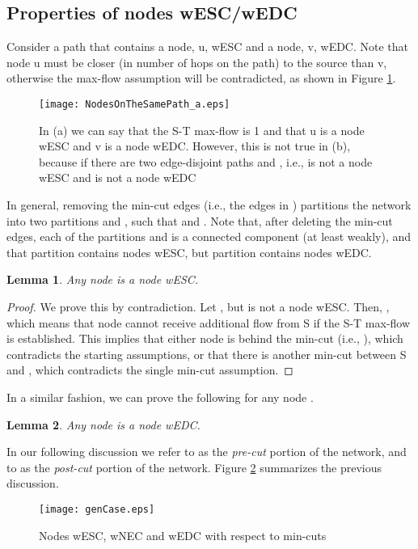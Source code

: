 \documentclass[conference]{IEEEtran}
\newtheorem{lemma}{Lemma}
\begin{document}
\subsection{Properties of nodes wESC/wEDC}
\label{SubSec:properties}
Consider a path that contains a node, u, wESC and a node, v, wEDC. Note that node u must be closer (in number of hops on the path) to the source than v, otherwise the max-flow assumption will be contradicted, as shown in Figure \ref{NodesOnTheSamePath}. 

\begin{figure}[tbh]
\centering
\texttt{[image: NodesOnTheSamePath\_a.eps]}
\caption{In (a) we can say that the S-T max-flow is 1 and that u is a node wESC and v is a node wEDC. However, this is not true in (b), because if  there are two edge-disjoint paths  and , i.e.,  is not a node wESC and  is not a node wEDC}
\label{NodesOnTheSamePath}
\end{figure}

In general, removing the min-cut edges (i.e., the edges in ) partitions the network into two partitions  and , such that  and . Note that, after deleting the min-cut edges, each of the partitions  and  is a connected component (at least weakly), and that partition  contains nodes wESC, but partition  contains nodes wEDC. 


\begin{lemma}
Any node  is a node wESC.
\end{lemma}

\begin{proof}
We prove this by contradiction. Let , but  is not a node wESC. Then, , which means that node  cannot receive additional flow from S if the S-T max-flow is established. This implies that either node  is behind the min-cut (i.e., ), which contradicts the starting assumptions, or that there is another min-cut between S and , which contradicts the single min-cut assumption.   
\end{proof}

In a similar fashion, we can prove the following for any node .

\begin{lemma}
Any node  is a node wEDC.
\end{lemma}

In our following discussion we refer to  as the \emph{pre-cut} portion of the network, and to  as the \emph{post-cut} portion of the network. Figure \ref{genCase} summarizes the previous discussion.

\begin{figure}[tbh]
\centering
\texttt{[image: genCase.eps]}
\caption{Nodes wESC, wNEC and wEDC with respect to min-cuts}
\label{genCase}
\end{figure}
\end{document}
